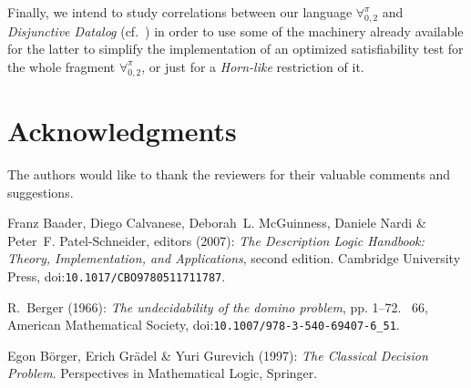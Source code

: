 \documentclass[submission,copyright,creativecommons]{eptcs}
\newcommand{\Lang}{\ensuremath{\mathbf{\forall}^{\pi}_{0,2}}\xspace}
\begin{document}
Finally, we intend to study correlations between our language \Lang
and \emph{Disjunctive Datalog} (cf.\ \cite{EitGotMan1997}) in order to
use some of the machinery already available for the latter to
simplify the implementation of an optimized satisfiability test for
the whole fragment \Lang, or just for a \emph{Horn-like} restriction
of it.

\section*{Acknowledgments}
The authors would like to thank the reviewers for their valuable 
comments and suggestions.



\begin{thebibliography}{10}
\providecommand{\bibitemdeclare}[2]{}
\providecommand{\surnamestart}{}
\providecommand{\surnameend}{}
\providecommand{\urlprefix}{Available at }
\providecommand{\url}[1]{\texttt{#1}}
\providecommand{\href}[2]{\texttt{#2}}
\providecommand{\urlalt}[2]{\href{#1}{#2}}
\providecommand{\doi}[1]{doi:\urlalt{http://dx.doi.org/#1}{#1}}
\providecommand{\bibinfo}[2]{#2}

\bibitemdeclare{book}{DLHANDBOOK2}
\bibinfo{editor}{Franz \surnamestart Baader\surnameend}, \bibinfo{editor}{Diego
  \surnamestart Calvanese\surnameend}, \bibinfo{editor}{Deborah~L.
  \surnamestart McGuinness\surnameend}, \bibinfo{editor}{Daniele \surnamestart
  Nardi\surnameend} \& \bibinfo{editor}{Peter~F. \surnamestart
  Patel-Schneider\surnameend}, editors (\bibinfo{year}{2007}):
  \emph{\bibinfo{title}{The Description Logic Handbook: Theory, Implementation,
  and Applications}}, \bibinfo{edition}{second} edition.
\newblock \bibinfo{publisher}{Cambridge University Press},
  \doi{10.1017/CBO9780511711787}.

\bibitemdeclare{inbook}{Ber1966}
\bibinfo{author}{R.~\surnamestart Berger\surnameend} (\bibinfo{year}{1966}):
  \emph{\bibinfo{title}{The undecidability of the domino problem}}, pp.
  \bibinfo{pages}{1--72}.
\newblock {\sl \bibinfo{series}{Mem. Amer. Math. Soc.}}~\bibinfo{volume}{66},
  \bibinfo{publisher}{American Mathematical Society},
  \doi{10.1007/978-3-540-69407-6\_51}.

\bibitemdeclare{book}{BorGraGur1997}
\bibinfo{author}{Egon \surnamestart B{\"o}rger\surnameend},
  \bibinfo{author}{Erich \surnamestart Gr{\"a}del\surnameend} \&
  \bibinfo{author}{Yuri \surnamestart Gurevich\surnameend}
  (\bibinfo{year}{1997}): \emph{\bibinfo{title}{The Classical Decision
  Problem}}.
\newblock \bibinfo{series}{Perspectives in Mathematical Logic},
  \bibinfo{publisher}{Springer}.


\end{thebibliography}
\end{document}
